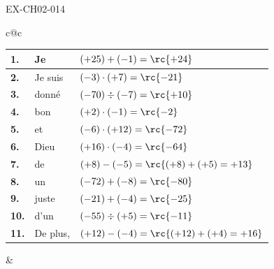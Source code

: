 \begin{solution}{EX-CH02-014}

\renewcommand{\arraystretch}{1.7}
\setlength{\tabcolsep}{4pt}
\vspace{2mm}

\begin{center}
\begin{tabular}{c@{\hspace{8mm}}c}

  \begin{tabular}{|>{\centering\arraybackslash}p{6mm}|p{2.5cm}|p{4.0cm}|}
    \hline
    \cellcolor{gray!40}\textbf{1.}  &Je& $(+25)+(-1)=\rc{+24}$               \\ \hline
    \cellcolor{gray!40}\textbf{2.}  &Je suis& $(-3)\cdot(+7)=\rc{-21}$              \\ \hline
    \cellcolor{gray!40}\textbf{3.}  &donné& $(-70)\div(-7)=\rc{+10}$              \\ \hline
    \cellcolor{gray!40}\textbf{4.}  &bon& $(+2)\cdot(-1)=\rc{-2}$               \\ \hline
    \cellcolor{gray!40}\textbf{5.}  &et& $(-6)\cdot(+12)=\rc{-72}$             \\ \hline
    \cellcolor{gray!40}\textbf{6.}  &Dieu& $(+16)\cdot(-4)=\rc{-64}$             \\ \hline
    \cellcolor{gray!40}\textbf{7.}  &de& $(+8)-(-5)=\rc{(+8)+(+5)=+13}$        \\ \hline
    \cellcolor{gray!40}\textbf{8.}  &un& $(-72)+(-8)=\rc{-80}$                 \\ \hline
    \cellcolor{gray!40}\textbf{9.}  &juste& $(-21)+(-4)=\rc{-25}$                 \\ \hline
    \cellcolor{gray!40}\textbf{10.} &d'un& $(-55)\div(+5)=\rc{-11}$              \\ \hline
    \cellcolor{gray!40}\textbf{11.} &De plus,& $(+12)-(-4)=\rc{(+12)+(+4)=+16}$      \\ \hline
  \end{tabular}

  &


\end{tabular}
\end{center}
\end{solution}
